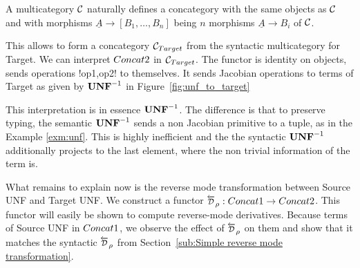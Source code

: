 \begin{definition}
    A multicategory $\mathcal{C}$ naturally defines a concategory with the same objects as $\mathcal{C}$ and
    with morphisms $\underline{A}\to [B_1,\ldots,B_n]$ being $n$ morphisms $\underline{A}\to B_i$ of $\mathcal{C}$. 
\end{definition}

This allows to form a concategory $\mathcal{C}_{Target}$ from the syntactic multicategory for Target.
We can interpret $Concat2$ in $\mathcal{C}_{Target}$. 
The functor is identity on objects, sends operations !op1,op2! to themselves. 
It sends Jacobian operations to terms of Target as given by $\mathbf{UNF}^{-1}$ in Figure~\ref{fig:unf_to_target}

This interpretation is in essence $\mathbf{UNF}^{-1}$. 
The difference is that to preserve typing, the semantic $\mathbf{UNF}^{-1}$
sends a non Jacobian primitive to a tuple, as in the Example \ref{exm:unf}. 
This is highly inefficient and the the syntactic $\mathbf{UNF}^{-1}$ 
additionally projects to the last element, where the non trivial information of the term is.

What remains to explain now is the reverse mode transformation between Source UNF and Target UNF.
We construct a functor $\Dsynrevsymbol_{\rho}:\ConcatS\to\ConcatT$. 
This functor will easily be shown to compute reverse-mode derivatives.
Because terms of Source UNF in $Concat1$, we observe the effect of $\Dsynrevsymbol_{\rho}$ on them
and show that it matches the syntactic $\Dsynrevsymbol_{\rho}$ 
from Section~\ref{sub:Simple reverse mode transformation}.

